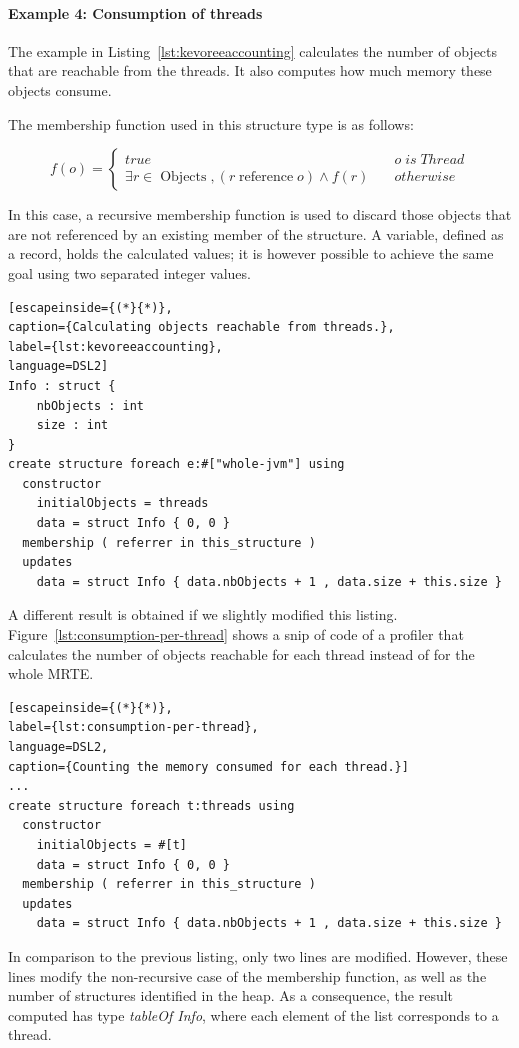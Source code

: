 \paragraph{Example 4: Consumption of threads}
The example in Listing~\ref{lst:kevoreeaccounting} calculates the number of objects that are reachable from the threads.
It also computes how much memory these objects consume.

The membership function used in this structure type is as follows:

\[
	f\left( o \right) = \begin{cases}
	true & \quad o \; is \; Thread \\
	\exists {r \in \operatorname{Objects}}, (r \operatorname{reference} o) \wedge f(r)  & \quad otherwise
	\end{cases}
\] 

In this case, a recursive membership function is used to discard those objects that are not referenced by an existing member of the structure.
A variable, defined as a record, holds the  calculated values; it is however possible to achieve the same goal using two separated integer values.

\begin{lstlisting}[escapeinside={(*}{*)},
caption={Calculating objects reachable from threads.},
label={lst:kevoreeaccounting},
language=DSL2]
Info : struct {
	nbObjects : int
	size : int	
}
create structure foreach e:#["whole-jvm"] using
  constructor
    initialObjects = threads
    data = struct Info { 0, 0 }
  membership ( referrer in this_structure )
  updates 
	data = struct Info { data.nbObjects + 1 , data.size + this.size }
\end{lstlisting}

A different result is obtained if we slightly modified this listing.
Figure~\ref{lst:consumption-per-thread} shows a snip of code of a profiler that calculates the number of objects reachable for each thread instead of for the whole MRTE.
\begin{lstlisting}[escapeinside={(*}{*)},
label={lst:consumption-per-thread},
language=DSL2,
caption={Counting the memory consumed for each thread.}]
...
create structure foreach t:threads using
  constructor
    initialObjects = #[t]
    data = struct Info { 0, 0 }
  membership ( referrer in this_structure )
  updates 
	data = struct Info { data.nbObjects + 1 , data.size + this.size }
\end{lstlisting}

In comparison to the previous listing, only two lines are modified.
However, these lines modify the non-recursive case of the membership function, as well as the number of structures identified in the heap.
As a consequence, the result computed has type \textit{tableOf Info}, where each element of the list corresponds to a thread.

